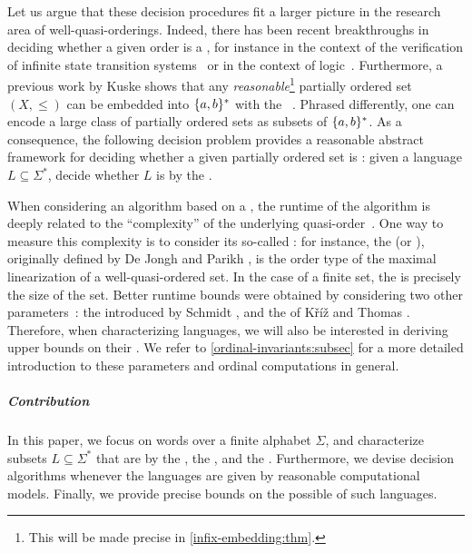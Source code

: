 \AP Let us argue that these decision procedures fit a larger picture in the
research area of well-quasi-orderings.
Indeed, there has been recent breakthroughs in deciding whether a given order
is a , for instance in the context of the verification of
infinite state transition systems~\cite{DBLP:conf/fsttcs/FinkelG19} or in the
context of logic~\cite{DBLP:journals/pacmpl/BergstrasserGLZ24}.
Furthermore, a previous work by Kuske shows that any
\emph{reasonable}\footnote{ This will be made precise in
\cref{infix-embedding:thm}. } partially ordered set $(X, \leq)$ can
be embedded into $\{ a,b \}^*$ with the ~\cite[Lemma
5.1]{DBLP:journals/ita/Kuske06}. Phrased differently, one can encode a large
class of partially ordered sets as subsets of $\{ a,b \}^*$. As a consequence,
the following decision problem provides a reasonable abstract framework for
deciding whether a given partially ordered set is :
given a language $L \subseteq \Sigma^*$, decide whether $L$ is
 by the .

\AP When considering an algorithm based on a , the
runtime of the algorithm is deeply related to the ``complexity'' of the
underlying quasi-order~\cite{SCHMITZ17}. One way to measure this complexity is
to consider its so-called : for instance, the
 (or ), originally defined by De Jongh and Parikh
\cite{dejongh77}, is the order type of the maximal linearization of a
well-quasi-ordered set. In the case of a finite set, the  is precisely
the size of the set. Better runtime bounds were obtained by considering two
other parameters~\cite{SCHMITZ19}: the  introduced by
Schmidt \cite{schmidt81}, and the  of Kříž and Thomas
\cite{kriz90b}. Therefore, when characterizing 
languages, we will also be interested in deriving upper bounds on their
. We refer to \cref{ordinal-invariants:subsec} for a
more detailed introduction to these parameters and ordinal computations in
general.

\subparagraph{Contribution} In this paper, we focus on words over a finite
alphabet $\Sigma$, and characterize subsets $L \subseteq \Sigma^*$ that are
 by the , the ,
and the . Furthermore, we devise decision algorithms
whenever the languages are given by reasonable computational models. Finally,
we provide precise bounds on the possible  of such
languages.

